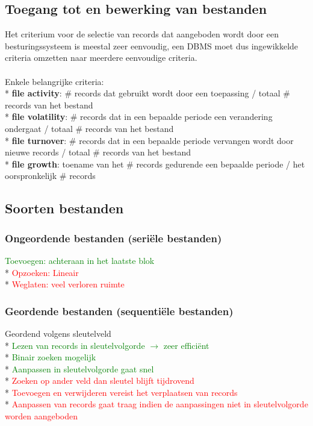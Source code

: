 \documentclass[10pt]{article}
\begin{document}
\subsection{Toegang tot en bewerking van bestanden}
Het criterium voor de selectie van records dat aangeboden wordt door een besturingssysteem is meestal zeer eenvoudig, een DBMS moet dus ingewikkelde criteria omzetten naar meerdere eenvoudige criteria.\\\\
Enkele belangrijke criteria:\\*
\textbf{file activity}: $\#$ records dat gebruikt wordt door een toepassing / totaal $\#$ records van het bestand\\*
\textbf{file volatility}: $\#$ records dat in een bepaalde periode een verandering ondergaat / totaal $\#$ records van het bestand\\*
\textbf{file turnover}: $\#$ records dat in een bepaalde periode vervangen wordt door nieuwe records / totaal $\#$ records van het bestand\\*
\textbf{file growth}: toename van het $\#$ records gedurende een bepaalde periode / het oorspronkelijk $\#$ records
\subsection{Soorten bestanden}
\subsubsection{Ongeordende bestanden (seri\"ele bestanden)}
\textcolor{green}{Toevoegen: achteraan in het laatste blok}\\*
\textcolor{red}{Opzoeken: Lineair}\\*
\textcolor{red}{Weglaten: veel verloren ruimte}
\subsubsection{Geordende bestanden (sequenti\"ele bestanden)}
Geordend volgens sleutelveld\\*
\textcolor{green}{Lezen van records in sleutelvolgorde $\rightarrow$ zeer effici\"ent}\\*
\textcolor{green}{Binair zoeken mogelijk}\\*
\textcolor{green}{Aanpassen in sleutelvolgorde gaat snel}\\*
\textcolor{red}{Zoeken op ander veld dan sleutel blijft tijdrovend}\\*
\textcolor{red}{Toevoegen en verwijderen vereist het verplaatsen van records}\\*
\textcolor{red}{Aanpassen van records gaat traag indien de aanpassingen niet in sleutelvolgorde worden aangeboden}
\end{document}
